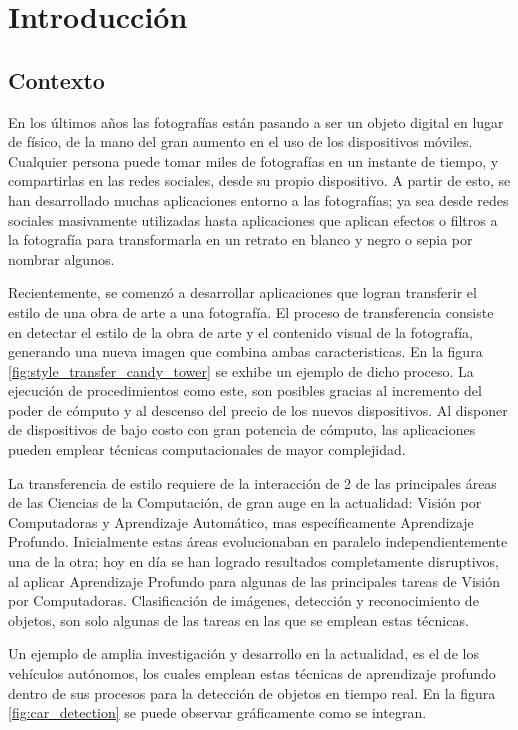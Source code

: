 \documentclass[a4paper,11pt,spanish]{book}
\begin{document}
\tableofcontents

\chapter{Introducción}
  \section {Contexto}
    En los últimos años las fotografías están pasando a ser un objeto digital en lugar de físico, de la mano del gran aumento en el uso de los dispositivos móviles.
    Cualquier persona puede tomar miles de fotografías en un instante de tiempo, y compartirlas en las redes sociales, desde su propio dispositivo.
    A partir de esto, se han desarrollado muchas aplicaciones entorno a las fotografías; ya sea desde redes sociales masivamente utilizadas hasta aplicaciones que aplican 
    efectos o filtros a la fotografía para transformarla en un retrato en blanco y negro o sepia por nombrar algunos.

    Recientemente, se comenzó a desarrollar aplicaciones que logran transferir el estilo de una obra de arte a una fotografía.
    El proceso de transferencia consiste en detectar el estilo de la obra de arte y el contenido visual de la fotografía, generando una nueva imagen que combina 
    ambas caracteristicas. En la figura \ref{fig:style_transfer_candy_tower} se exhibe un ejemplo de dicho proceso.
    La ejecución de procedimientos como este, son posibles gracias al incremento del poder de cómputo y al descenso del precio de los nuevos dispositivos. 
    Al disponer de dispositivos de bajo costo con gran potencia de cómputo, las aplicaciones pueden emplear técnicas computacionales de mayor complejidad.

    La transferencia de estilo requiere de la interacción de 2 de las principales áreas de las Ciencias de la Computación, de gran auge en la actualidad: 
    Visión por Computadoras y Aprendizaje Automático, mas específicamente Aprendizaje Profundo.
    Inicialmente estas áreas evolucionaban en paralelo independientemente una de la otra; hoy en día se han logrado resultados completamente disruptivos, al aplicar
    Aprendizaje Profundo para algunas de las principales tareas de Visión por Computadoras.
    Clasificación de imágenes, detección y reconocimiento de objetos, son solo algunas de las tareas en las que se emplean estas técnicas.

    Un ejemplo de amplia investigación y desarrollo en la actualidad, es el de los vehículos autónomos,
    los cuales emplean estas técnicas de aprendizaje profundo dentro de sus procesos para la detección de objetos en tiempo real. 
    En la figura \ref{fig:car_detection} se puede observar gráficamente como se integran.
\end{document}
